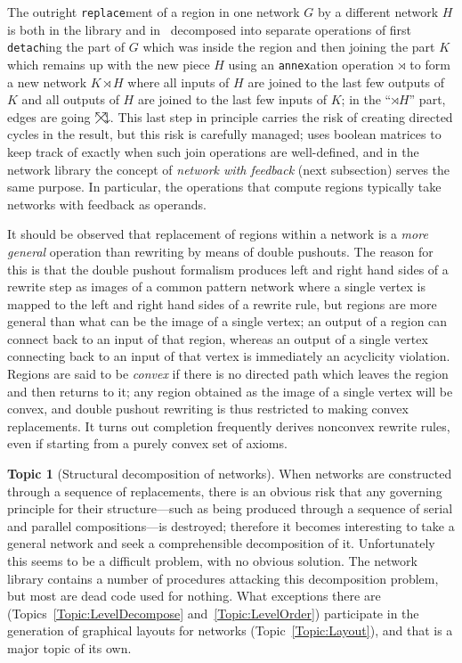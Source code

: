 \documentclass{article}
\theoremstyle{definition}
\newtheorem{topic}{Topic}
\begin{document}
The outright \texttt{replace}ment of a region in one network $G$ by a 
different network $H$ is both in the library and in~\cite{NR1} 
decomposed into separate operations of first \texttt{detach}ing the 
part of $G$ which was inside the region and then joining the part $K$ 
which remains up with the new piece $H$ using an \texttt{annex}ation 
operation $\rtimes$ to form a new network $K \rtimes H$ where all 
inputs of $H$ are joined to the last few outputs of $K$ and all 
outputs of $H$ are joined to the last few inputs of $K$; in the 
``$\rtimes H$'' part, edges are going 
$\rlap{$\nwarrow$}{\nearrow\mkern-4mu\downarrow\mkern-2mu}$. This 
last step in principle carries the risk of creating directed cycles 
in the result, but this risk is carefully managed; 
\cite[Sec.~7.1]{NR1} uses boolean matrices to keep track of exactly 
when such join operations are well-defined, and in the network 
library the concept of \emph{network with feedback} (next subsection) 
serves the same purpose. In particular, the operations that compute 
regions typically take networks with feedback as operands.

It should be observed that replacement of regions within a network is 
a \emph{more general} operation than rewriting by means of double 
pushouts. The reason for this is that the double pushout formalism 
produces left and right hand sides of a rewrite step as images of a 
common pattern network where a single vertex is mapped to the left 
and right hand sides of a rewrite rule, but regions are more general 
than what can be the image of a single vertex; an output of a region 
can connect back to an input of that region, whereas an output of a 
single vertex connecting back to an input of that vertex is 
immediately an acyclicity violation. Regions are said to be 
\emph{convex} if there is no directed path which leaves the region 
and then returns to it; any region obtained as the image of a single 
vertex will be convex, and double pushout rewriting is thus 
restricted to making convex replacements. It turns out completion 
frequently derives nonconvex rewrite rules, even if starting from a 
purely convex set of axioms.

\begin{topic}[Structural decomposition of networks] \label{Topic:NwDecompose}
  When networks are constructed through a sequence of replacements, 
  there is an obvious risk that any governing principle for their 
  structure---such as being produced through a sequence of serial and 
  parallel compositions---is destroyed; therefore it becomes 
  interesting to take a general network and seek a comprehensible 
  decomposition of it. Unfortunately this seems to be a difficult 
  problem, with no obvious solution. The network library contains a 
  number of procedures attacking this decomposition problem, but most 
  are dead code used for nothing. What exceptions there are 
  (Topics~\ref{Topic:LevelDecompose} and~\ref{Topic:LevelOrder}) 
  participate in the generation of graphical layouts for networks 
  (Topic~\ref{Topic:Layout}), and that is a major topic of its own.
\end{topic}
\end{document}
